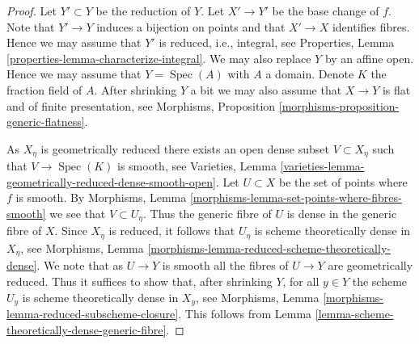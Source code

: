 \documentclass[10pt,a4paper]{amsart}
\theoremstyle{plain}
\theoremstyle{definition}
\theoremstyle{remark}
\numberwithin{equation}{subsection}
\def\Spec{\mathop{\mathrm{Spec}}}
\begin{document}
\begin{proof}
Let $Y' \subset Y$ be the reduction of $Y$. Let $X' \to Y'$
be the base change of $f$. Note that $Y' \to Y$
induces a bijection on points and that $X' \to X$ identifies fibres.
Hence we may assume that $Y'$ is reduced, i.e., integral, see
Properties, Lemma \ref{properties-lemma-characterize-integral}.
We may also replace $Y$ by an affine open. Hence we may assume that
$Y = \Spec(A)$ with $A$ a domain. Denote $K$ the
fraction field of $A$. After shrinking $Y$ a bit we may also assume that
$X \to Y$ is flat and of finite presentation, see
Morphisms, Proposition \ref{morphisms-proposition-generic-flatness}.

\medskip\noindent
As $X_\eta$ is geometrically reduced there exists an open dense
subset $V \subset X_\eta$ such that $V \to \Spec(K)$ is smooth, see
Varieties, Lemma \ref{varieties-lemma-geometrically-reduced-dense-smooth-open}.
Let $U \subset X$ be the set of points where $f$ is smooth. By
Morphisms, Lemma \ref{morphisms-lemma-set-points-where-fibres-smooth}
we see that $V \subset U_\eta$. Thus the generic fibre of $U$ is dense
in the generic fibre of $X$. Since $X_\eta$ is reduced, it follows
that $U_\eta$ is scheme theoretically dense in $X_\eta$, see
Morphisms, Lemma \ref{morphisms-lemma-reduced-scheme-theoretically-dense}.
We note that as $U \to Y$ is smooth all the fibres of $U \to Y$
are geometrically reduced. Thus it suffices to show that, after
shrinking $Y$, for all $y \in Y$ the scheme $U_y$ is scheme theoretically
dense in $X_y$, see
Morphisms, Lemma \ref{morphisms-lemma-reduced-subscheme-closure}.
This follows from
Lemma \ref{lemma-scheme-theoretically-dense-generic-fibre}.
\end{proof}
\end{document}
